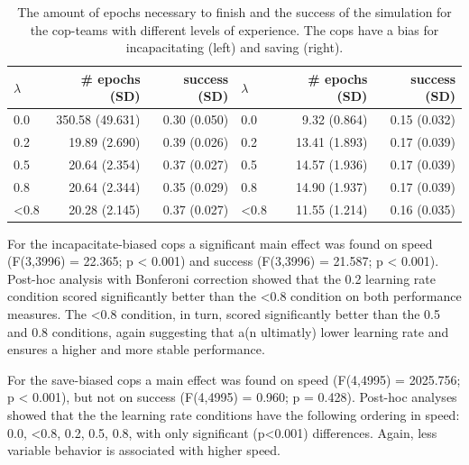 \begin{table}
\begin{center}
\begin{tabular}{l r  r | l r  r}
$\lambda$ &  \# epochs (SD) & success (SD) & $\lambda$ &  \# epochs (SD) & success (SD)\\
\hline
0.0 & 350.58 (49.631) & 0.30 (0.050) & 0.0 & 9.32 (0.864) & 0.15 (0.032)\\
0.2 & 19.89 (2.690) & 0.39 (0.026) & 0.2 & 13.41 (1.893) & 0.17 (0.039)\\
0.5 & 20.64 (2.354) & 0.37 (0.027) & 0.5 & 14.57 (1.936) & 0.17 (0.039)\\
0.8 & 20.64 (2.344) & 0.35 (0.029) & 0.8 & 14.90 (1.937) & 0.17 (0.039)\\
<0.8 & 20.28 (2.145) & 0.37 (0.027) & <0.8 & 11.55 (1.214) & 0.16 (0.035)\\
\hline
\end{tabular}
\caption{The amount of epochs necessary to finish and the success of the simulation for the cop-teams with different levels of experience. The cops have a bias for incapacitating (left) and saving (right).}
\label{tab:ResultsBias}
\end{center}
\end{table}
For the incapacitate-biased cops a significant main effect was found on speed (F(3,3996) = 22.365; p < 0.001) and success (F(3,3996) = 21.587; p < 0.001). Post-hoc analysis with Bonferoni correction showed that the 0.2 learning rate condition scored significantly better than the <0.8 condition on both performance measures. The <0.8 condition, in turn, scored significantly better than the 0.5 and 0.8 conditions, again suggesting that a(n ultimatly) lower learning rate and ensures a higher and more stable performance. 

For the save-biased cops a main effect was found on speed (F(4,4995) = 2025.756; p < 0.001), but not on success (F(4,4995) = 0.960; p = 0.428). Post-hoc analyses showed that the the learning rate conditions have the following ordering in speed: 0.0, <0.8, 0.2, 0.5, 0.8, with only significant (p<0.001) differences. Again, less variable behavior is associated with higher speed.

